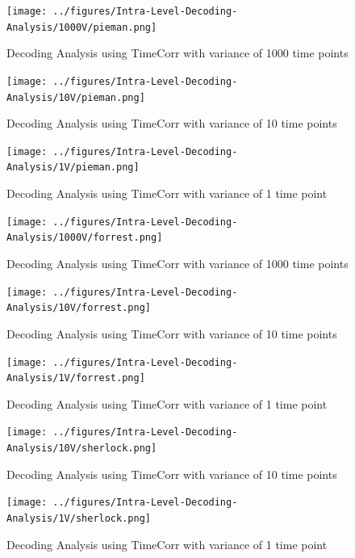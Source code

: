 \documentclass[11pt]{article}
\begin{document}
\begin{figure}[!htb]
\caption{Decoding Analysis using TimeCorr with variance of 1000 time points}
\centering
\texttt{[image: ../figures/Intra-Level-Decoding-Analysis/1000V/pieman.png]}
\label{fig:piemanDC1000}
\end{figure}

\begin{figure}[!htb]
\caption{Decoding Analysis using TimeCorr with variance of 10 time points}
\centering
\texttt{[image: ../figures/Intra-Level-Decoding-Analysis/10V/pieman.png]}
\label{fig:piemanDC10}
\end{figure}

\begin{figure}[!htb]
\caption{Decoding Analysis using TimeCorr with variance of 1 time point}
\centering
\texttt{[image: ../figures/Intra-Level-Decoding-Analysis/1V/pieman.png]}
\label{fig:piemanDC1}
\end{figure}

\begin{figure}[!htb]
\caption{Decoding Analysis using TimeCorr with variance of 1000 time points}
\centering
\texttt{[image: ../figures/Intra-Level-Decoding-Analysis/1000V/forrest.png]}
\label{fig:forrestDC1000}
\end{figure}

\begin{figure}[!htb]
\caption{Decoding Analysis using TimeCorr with variance of 10 time points}
\centering
\texttt{[image: ../figures/Intra-Level-Decoding-Analysis/10V/forrest.png]}
\label{fig:forrestDC10}
\end{figure}

\begin{figure}[!htb]
\caption{Decoding Analysis using TimeCorr with variance of 1 time point}
\centering
\texttt{[image: ../figures/Intra-Level-Decoding-Analysis/1V/forrest.png]}
\label{fig:forrestDC1}
\end{figure}

\begin{figure}[!htb]
\caption{Decoding Analysis using TimeCorr with variance of 10 time points}
\centering
\texttt{[image: ../figures/Intra-Level-Decoding-Analysis/10V/sherlock.png]}
\label{fig:sherlockDC10}
\end{figure}

\begin{figure}[!htb]
\caption{Decoding Analysis using TimeCorr with variance of 1 time point}
\centering
\texttt{[image: ../figures/Intra-Level-Decoding-Analysis/1V/sherlock.png]}
\label{fig:sherlockDC1}
\end{figure}
\end{document}
